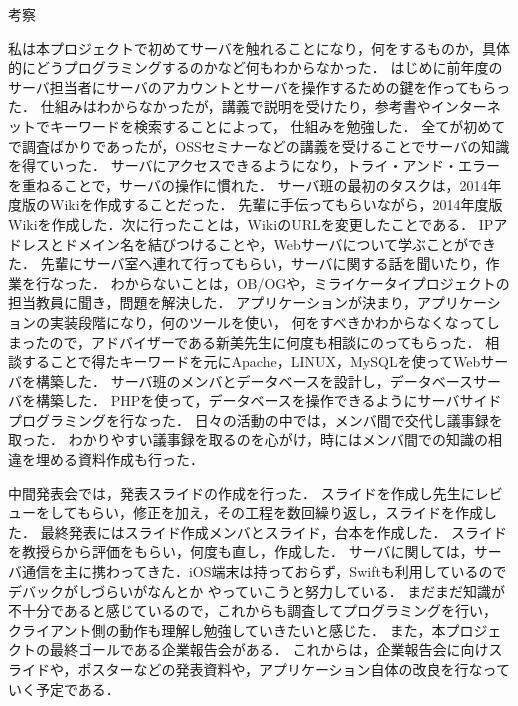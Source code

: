 \par
考察
\par
  私は本プロジェクトで初めてサーバを触れることになり，何をするものか，具体的にどうプログラミングするのかなど何もわからなかった．
はじめに前年度のサーバ担当者にサーバのアカウントとサーバを操作するための鍵を作ってもらった．
仕組みはわからなかったが，講義で説明を受けたり，参考書やインターネットでキーワードを検索することによって，
仕組みを勉強した．
全てが初めてで調査ばかりであったが，OSSセミナーなどの講義を受けることでサーバの知識を得ていった．
サーバにアクセスできるようになり，トライ・アンド・エラーを重ねることで，サーバの操作に慣れた．
サーバ班の最初のタスクは，2014年度版のWikiを作成することだった．
先輩に手伝ってもらいながら，2014年度版Wikiを作成した．次に行ったことは，WikiのURLを変更したことである．
IPアドレスとドメイン名を結びつけることや，Webサーバについて学ぶことができた．
先輩にサーバ室へ連れて行ってもらい，サーバに関する話を聞いたり，作業を行なった．
わからないことは，OB/OGや，ミライケータイプロジェクトの担当教員に聞き，問題を解決した．
アプリケーションが決まり，アプリケーションの実装段階になり，何のツールを使い，
何をすべきかわからなくなってしまったので，アドバイザーである新美先生に何度も相談にのってもらった．
相談することで得たキーワードを元にApache，LINUX，MySQLを使ってWebサーバを構築した．
サーバ班のメンバとデータベースを設計し，データベースサーバを構築した．
PHPを使って，データベースを操作できるようにサーバサイドプログラミングを行なった．
日々の活動の中では，メンバ間で交代し議事録を取った．
わかりやすい議事録を取るのを心がけ，時にはメンバ間での知識の相違を埋める資料作成も行った．
\par
  中間発表会では，発表スライドの作成を行った．
スライドを作成し先生にレビューをしてもらい，修正を加え，その工程を数回繰り返し，スライドを作成した．
最終発表にはスライド作成メンバとスライド，台本を作成した．
スライドを教授らから評価をもらい，何度も直し，作成した．
サーバに関しては，サーバ通信を主に携わってきた．iOS端末は持っておらず，Swiftも利用しているのでデバックがしづらいがなんとか
やっていこうと努力している．
まだまだ知識が不十分であると感じているので，これからも調査してプログラミングを行い，
クライアント側の動作も理解し勉強していきたいと感じた．
また，本プロジェクトの最終ゴールである企業報告会がある．
これからは，企業報告会に向けスライドや，ポスターなどの発表資料や，アプリケーション自体の改良を行なっていく予定である．
\par
{}
